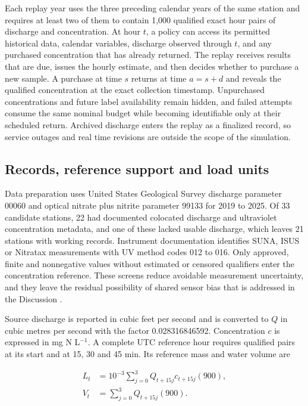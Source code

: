 \documentclass[lineno,pdflatex,sn-apa]{sn-jnl}%
\theoremstyle{thmstyleone}%
\theoremstyle{thmstyletwo}%
\theoremstyle{thmstylethree}%
\begin{document}
Each replay year uses the three preceding calendar years of the same station and requires at least two of them to contain 1,000 qualified exact hour pairs of discharge and concentration. At hour $t$, a policy can access its permitted historical data, calendar variables, discharge observed through $t$, and any purchased concentration that has already returned. The replay receives results that are due, issues the hourly estimate, and then decides whether to purchase a new sample. A purchase at time $s$ returns at time $a=s+d$ and reveals the qualified concentration at the exact collection timestamp. Unpurchased concentrations and future label availability remain hidden, and failed attempts consume the same nominal budget while becoming identifiable only at their scheduled return. Archived discharge enters the replay as a finalized record, so service outages and real time revisions are outside the scope of the simulation.

\subsection{Records, reference support and load units}

Data preparation uses United States Geological Survey discharge parameter 00060 and optical nitrate plus nitrite parameter 99133 for 2019 to 2025. Of 33 candidate stations, 22 had documented colocated discharge and ultraviolet concentration metadata, and one of these lacked usable discharge, which leaves 21 stations with working records. Instrument documentation identifies SUNA, ISUS or Nitratax measurements with UV method codes 012 to 016. Only approved, finite and nonnegative values without estimated or censored qualifiers enter the concentration reference. These screens reduce avoidable measurement uncertainty, and they leave the residual possibility of shared sensor bias that is addressed in the Discussion \citep{wagner2006,pellerin2013}.

Source discharge is reported in cubic feet per second and is converted to $Q$ in cubic metres per second with the factor 0.028316846592. Concentration $c$ is expressed in mg N L$^{-1}$. A complete UTC reference hour requires qualified pairs at its start and at 15, 30 and 45 min. Its reference mass and water volume are

\begin{align}
L_t &= 10^{-3}\sum_{j=0}^{3}Q_{t+15j}c_{t+15j}(900),\\
V_t &= \sum_{j=0}^{3}Q_{t+15j}(900).
\end{align}
\end{document}
